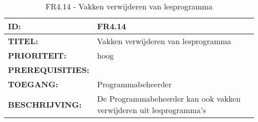 \noindent\begin{table}[H]
            \begin{tabular}{l | p{10cm}}
                \textbf{ID:} & FR4.14 \\ \hline
                \textbf{TITEL:} & Vakken verwijderen van lesprogramma\\ \hline
                \textbf{PRIORITEIT:} &  hoog \\ \hline
                \textbf{PREREQUISITIES:} & \\ \hline
                \textbf{TOEGANG:} & Programmabeheerder \\ \hline
                \textbf{BESCHRIJVING:} & De Programmabeheerder kan ook vakken verwijderen uit lesprogramma’s \\ 
            \end{tabular}\\
            \caption{FR4.14 - Vakken verwijderen van lesprogramma}
            \label{tab:FR4.14 - Vakken verwijderen van lesprogramma}
        \end{table}        
        
\clearpage